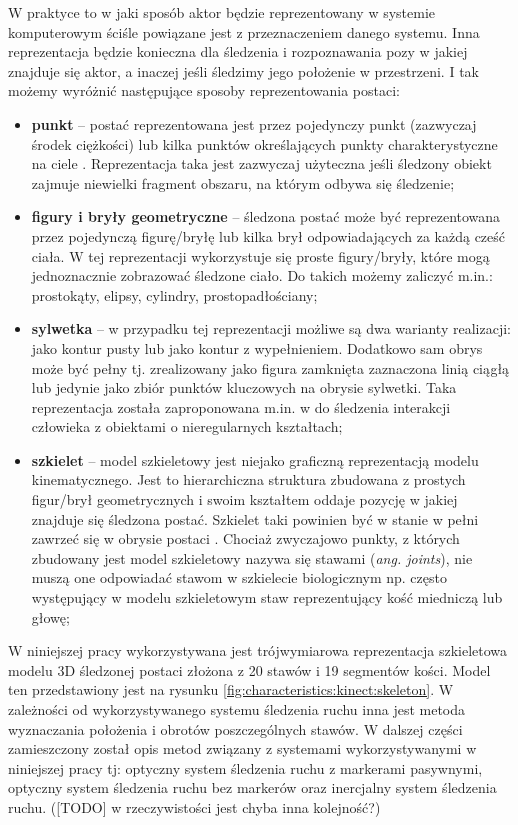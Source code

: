 W praktyce to w jaki sposób aktor będzie reprezentowany w systemie komputerowym ściśle powiązane jest z przeznaczeniem danego systemu. Inna reprezentacja będzie konieczna dla śledzenia i rozpoznawania pozy w jakiej znajduje się aktor, a inaczej jeśli śledzimy jego położenie w przestrzeni. I tak możemy wyróżnić następujące sposoby reprezentowania postaci:
\begin{itemize}
	\item \textbf{punkt} -- postać reprezentowana jest przez pojedynczy punkt (zazwyczaj środek ciężkości) \cite{Veenman2001} lub kilka punktów określających punkty charakterystyczne na ciele \cite{Serby2004}. Reprezentacja taka jest zazwyczaj użyteczna jeśli śledzony obiekt zajmuje niewielki fragment obszaru, na którym odbywa się śledzenie;
	\item \textbf{figury i bryły geometryczne} -- śledzona postać może być reprezentowana przez pojedynczą figurę/bryłę \cite{Comaniciu2003} lub kilka brył odpowiadających za każdą cześć ciała. W tej reprezentacji wykorzystuje się proste figury/bryły, które mogą jednoznacznie zobrazować śledzone ciało. Do takich możemy zaliczyć m.in.: prostokąty, elipsy, cylindry, prostopadłościany;
	\item \textbf{sylwetka} -- w przypadku tej reprezentacji możliwe są dwa warianty realizacji: jako kontur pusty lub jako kontur z wypełnieniem. Dodatkowo sam obrys może być pełny tj. zrealizowany jako figura zamknięta zaznaczona linią ciągłą lub jedynie jako zbiór punktów kluczowych na obrysie sylwetki. Taka reprezentacja została zaproponowana m.in. w \cite{Yilmaz2004} do śledzenia interakcji człowieka z obiektami o nieregularnych kształtach;
	\item \textbf{szkielet} -- model szkieletowy jest niejako graficzną reprezentacją modelu kinematycznego. Jest to hierarchiczna struktura zbudowana z prostych figur/brył geometrycznych i swoim kształtem oddaje pozycję w jakiej znajduje się śledzona postać. Szkielet taki powinien być w stanie w pełni zawrzeć się w obrysie postaci \cite{Ali2001}. Chociaż zwyczajowo punkty, z których zbudowany jest model szkieletowy nazywa się stawami (\emph{ang. joints}), nie muszą one odpowiadać stawom w szkielecie biologicznym np. często występujący w modelu szkieletowym staw reprezentujący kość miedniczą lub głowę;
\end{itemize}
\vspace{2cm}
W niniejszej pracy wykorzystywana jest trójwymiarowa reprezentacja szkieletowa modelu 3D śledzonej postaci złożona z 20 stawów i 19 segmentów kości. Model ten przedstawiony jest na rysunku \ref{fig:characteristics:kinect:skeleton}. W zależności od wykorzystywanego systemu śledzenia ruchu inna jest metoda wyznaczania położenia i obrotów poszczególnych stawów. W dalszej części zamieszczony został opis metod związany z systemami wykorzystywanymi w niniejszej pracy tj: optyczny system śledzenia ruchu z markerami pasywnymi, optyczny system śledzenia ruchu bez markerów oraz inercjalny system śledzenia ruchu. ([TODO] w rzeczywistości jest chyba inna kolejność?)

